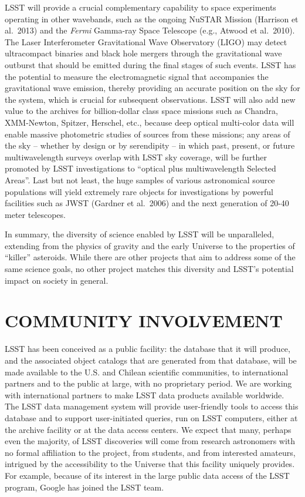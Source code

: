 \documentclass{emulateapj}
\begin{document}
LSST will provide a crucial complementary capability to space 
experiments operating in other wavebands, such as the ongoing
NuSTAR Mission (Harrison et al.~2013)
and the {\it Fermi} 
Gamma-ray Space Telescope (e.g., Atwood et al.~2010). 
The Laser Interferometer Gravitational 
Wave Observatory (LIGO) may detect ultracompact binaries and black hole mergers through the 
gravitational wave outburst that should be emitted during the final stages of such events. 
LSST has the potential to measure the electromagnetic signal that accompanies the gravitational wave emission, 
thereby providing an accurate position on the sky for the system, which is 
crucial for subsequent observations. LSST will also add new value to the archives for 
billion-dollar class space missions such as Chandra, XMM-Newton, Spitzer, Herschel,
etc., because deep optical multi-color data will enable 
massive photometric  studies of sources from these missions;
any areas of the sky -- whether by design or by serendipity -- in which past, present, or future 
multiwavelength surveys overlap with LSST sky coverage, will be further promoted by LSST 
investigations to ``optical plus multiwavelength Selected Areas''.   
Last but not least, the huge samples of various astronomical source
populations will yield extremely rare objects for investigations by powerful
facilities such as JWST (Gardner et al.~2006) and the next generation
of 20-40 meter telescopes.  

In summary, the diversity of science enabled by LSST will be 
unparalleled, extending from the physics of gravity and the
early Universe to the properties of ``killer'' asteroids. While
there are other projects that aim to address some of the same
science goals, no other project matches this diversity and 
LSST's potential impact on society in general. 


\section{   COMMUNITY INVOLVEMENT   }
\label{Sec:community}

LSST has been conceived as a public facility: the database that it will
produce, and the associated object catalogs that are generated from that
database, will be made available to the U.S. and Chilean scientific communities,
to international partners and to the public at large, with no proprietary period. 
We are working with international partners 
to make LSST data products available worldwide. The LSST data management 
system will provide user-friendly tools to access this database and to support
user-initiated queries, run on LSST computers, either at the archive facility 
or at the data access centers. We expect that many, perhaps even the majority,
of LSST discoveries will come from research astronomers with no formal
affiliation to the project, from students, and from interested amateurs, 
intrigued by the accessibility to the Universe that this facility uniquely 
provides. For example, because of its interest in the large public data access 
of the LSST program, Google has joined the LSST team. 
\end{document}
